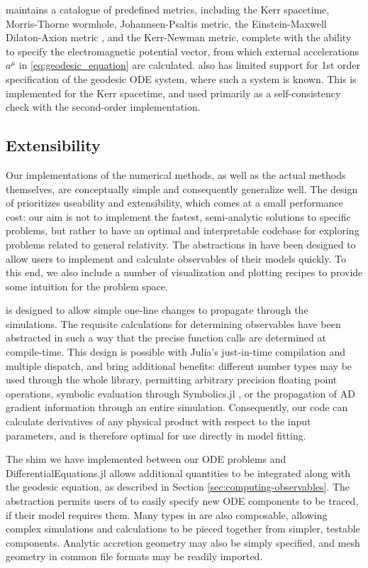 \Gradus maintains a catalogue of predefined metrics, including the Kerr spacetime, Morris-Thorne wormhole, Johannsen-Psaltis metric, the Einstein-Maxwell Dilaton-Axion metric , and the Kerr-Newman metric, complete with the ability to specify the electromagnetic potential vector, from which external accelerations $a^\mu$ in \eqref{eq:geodesic_equation} are calculated. \Gradus also has limited support for 1st order specification of the geodesic ODE system, where such a system is known. This is implemented for the Kerr spacetime, and used primarily as a self-consistency check with the second-order implementation.

\subsection{Extensibility}

Our implementations of the numerical methods, as well as the actual methods themselves, are conceptually simple and consequently generalize well. The design of \Gradus prioritizes useability and extensibility, which comes at a small performance cost: our aim is not to implement the fastest, semi-analytic solutions to specific problems, but rather to have an optimal and interpretable codebase for exploring problems related to general relativity. The abstractions in \Gradus have been designed to allow users to implement and calculate observables of their models quickly. To this end, we also include a number of visualization and plotting recipes to provide some intuition for the problem space.

\Gradus is designed to allow simple one-line changes to propagate through the simulations. The requisite calculations for determining observables have been abstracted in such a way that the precise function calls are determined at compile-time. This design is possible with Julia's just-in-time compilation and multiple dispatch, and bring additional benefits: different number types may be used through the whole library, permitting arbitrary precision floating point operations, symbolic evaluation through Symbolics.jl \citep{symbolics_julia}, or the propagation of AD gradient information through an entire simulation. Consequently, our code can calculate derivatives of any physical product with respect to the input parameters, and is therefore optimal for use directly in model fitting.

The shim we have implemented between our ODE problems and DifferentialEquations.jl allows additional quantities to be integrated along with the geodesic equation, as described in Section \ref{sec:computing-observables}. The abstraction permits users of \Gradus to easily specify new ODE components to be traced, if their model requires them. Many types in \Gradus are also composable, allowing complex simulations and calculations to be pieced together from simpler, testable components. Analytic accretion geometry may also be simply specified, and mesh geometry in common file formats may be readily imported.

